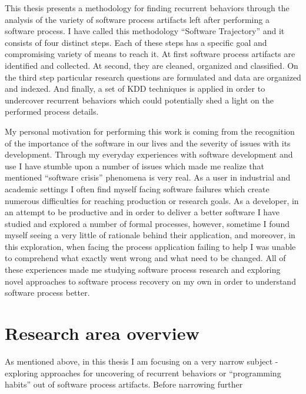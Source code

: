 This thesis presents a methodology for finding recurrent behaviors through the 
analysis of the variety of software process artifacts left after performing a 
software process. I have called this methodology ``Software Trajectory'' and it consists 
of four distinct steps. Each of these steps has a specific goal and compromising variety of 
means to reach it. 
At first software process artifacts are identified and collected. 
At second, they are cleaned, organized and classified. 
On the third step particular research questions are formulated and data are organized and indexed. 
And finally, a set of KDD techniques is applied in order to undercover recurrent behaviors which 
could potentially shed a light on the performed process details. 

My personal motivation for performing this work is coming from the recognition of the 
importance of the software in our lives and the severity of issues with its development. 
Through my everyday experiences with software development and use I have stumble upon 
a number of issues which made me realize that mentioned ``software crisis'' phenomena is very real.
As a user in industrial and academic settings I often find myself facing software failures 
which create numerous difficulties for reaching production or research goals. As a developer, 
in an attempt to be productive and in order to deliver a better software I have studied and 
explored a number of formal processes, however, sometime I found myself seeing a very little of 
rationale behind their application, and moreover, in this exploration, when facing the process
application failing to help I was unable to comprehend what exactly went wrong and what need 
to be changed. All of these experiences made me studying software process research and exploring
novel approaches to software process recovery on my own in order to understand software process better.

\section{Research area overview}
As mentioned above, in this thesis I am focusing on a very narrow subject - exploring approaches
for uncovering of recurrent behaviors or ``programming habits'' out of software process artifacts.
Before narrowing further 


